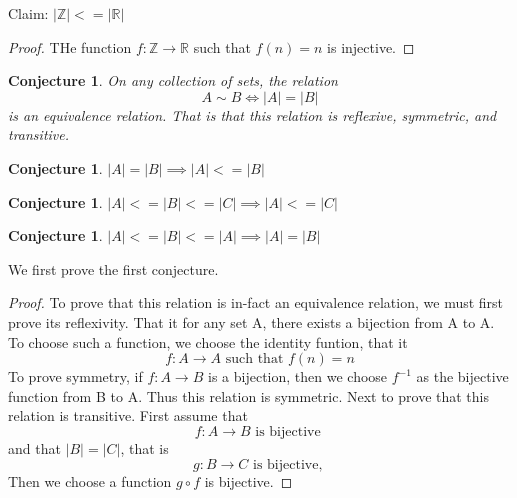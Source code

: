 \documentclass{article}
\newtheorem{conjecture}[theorem]{Conjecture}
\begin{document}
Claim: $|\mathbb{Z}| <= |\mathbb{R}|$

\begin{proof}
    THe function $f: \mathbb{Z} \rightarrow \mathbb{R}$ such that $f(n) = n$ is injective.
\end{proof}

\begin{conjecture} 
On any collection of sets, the relation 
\begin{equation}
    A \sim B \iff |A| = |B|
\end{equation}
is an equivalence relation. That is that this relation is reflexive, symmetric, and transitive.
\end{conjecture}

\begin{conjecture}
    $|A| = |B| \implies |A| <= |B|$
\end{conjecture}

\begin{conjecture}
    $|A| <= |B| <= |C| \implies |A| <= |C|$
\end{conjecture}

\begin{conjecture}
    $|A| <= |B| <= |A| \implies |A| = |B|$
\end{conjecture}

We first prove the first conjecture.

\begin{proof}
    To prove that this relation is in-fact an equivalence relation, we must first prove its reflexivity. That it
    for any set A, there exists a bijection from A to A. To choose such a function, we choose the identity funtion, that it 
    \begin{equation}
        f: A \rightarrow A \textrm{ such that } f(n) = n
    \end{equation}
    To prove symmetry, if $f: A \rightarrow B$ is a bijection, then we choose $f^{-1}$ as the bijective function from B to A. Thus this relation is symmetric. Next to prove 
    that this relation is transitive. First assume that 
    \begin{equation}
        f: A \rightarrow B \textrm{ is bijective }
    \end{equation}
    and that $|B| = |C|$, that is 
    \begin{equation}
        g: B \rightarrow C \textrm{ is bijective, }
    \end{equation} 
    Then we choose a function $g \circ f$ is bijective. 
\end{proof}
\end{document}
